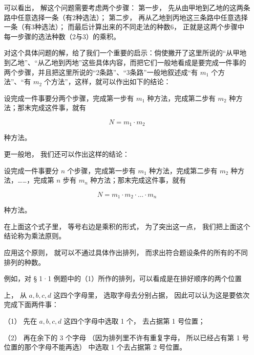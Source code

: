 可以看出， 解这个问题需要考虑两个步骤： 第一步，
先从由甲地到乙地的这两条路中任意选择一条（有2种选法）； 第二步，
再从乙地到丙地这三条路中任意选择一条（有3种选法）；
而最后计算出来的不同走法的种数6，
正就是这两个步骤中每一步骤的选法种数（2与3）的乘积。

对这个具体问题的解，给了我们一个重要的启示：倘使撇开了这里所说的``从甲地到乙地''、``从乙地到丙地''这些具体内容，而把它们一般地看成是要完成一件事的两个步骤，并且把这里所说的``2条路''、``3条路''一般地叙述成``有
\(m_{1}\) 个方法''、``有 \(m_{2}\)
个方法''，这样，就可以作出如下的结论：

设完成一件事要分两个步骤，完成第一步有 \(m_{1}\) 种方法，完成第二步有
\(m_{2}\) 种方法；那末完成这件事，就有

\[
N = m _ {1} \cdot m _ {2}
\]

种方法。

更一般地， 我们还可以作出这样的结论：

设完成一件事要分 \(n\) 个步骤，完成第一步有 \(m_{1}\)
种方法，完成第二步有 \(m_{2}\) 种方法，\ldots\ldots，完成第 \(n\) 步有
\(m_{n}\) 种方法；那末完成这件事，就有

\[
\boxed {N = m _ {1} \cdot m _ {2} \cdot \dots \cdot m _ {n}}
\]

种方法。

在上面这个式子里， 等号右边是乘积的形式， 为了突出这一点，
我们把上面这个结论称为乘法原则。

应用这个原则， 就可以不通过具体作出排列，
而求出符合题设条件的所有的不同排列的种数。

例如，对 § 1·1 例题中的（1）所作的排列，可以看成是在排好顺序的两个位置

\begin{figure}
\centering
{}
\end{figure}

上， 从 \(a, b, c, d\) 这四个字母里， 选取字母去分别占据，
因此可以认为这是要依次完成下面两件事：

（1） 先在 \(a, b, c, d\) 这四个字母中选取 1 个， 去占据第 1 号位置；

（2） 再在余下的 3 个字母 （因为排列里不许有重复字母， 所以已经占有第 1
号位置的那个字母不能再选） 中选取 1 个去占据第 2 号位置。

